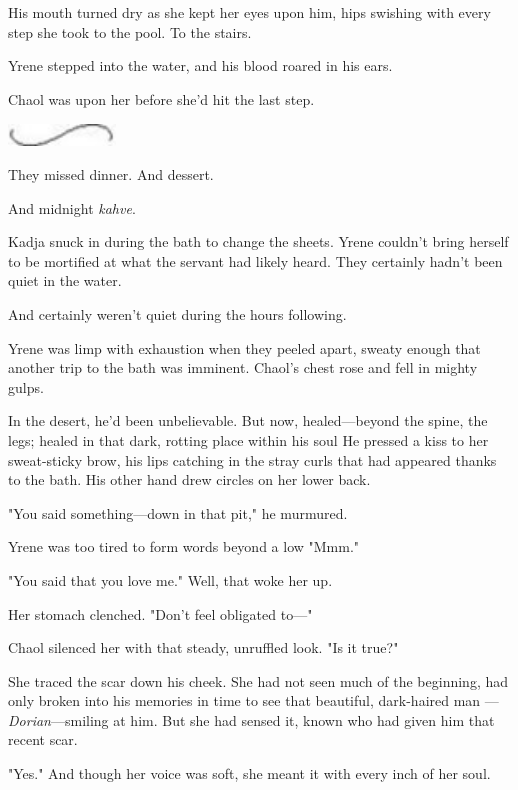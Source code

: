 His mouth turned dry as she kept her eyes upon him, hips swishing with every step she took to the pool.
To the stairs.

Yrene stepped into the water, and his blood roared in his ears.

Chaol was upon her before she'd hit the last step.

\begin{center}
	\includegraphics[width=1.12in,height=0.24in]{images/seperator}
\end{center}

They missed dinner.
And dessert.

And midnight \emph{kahve}.

Kadja snuck in during the bath to change the sheets.
Yrene couldn't bring herself to be mortified at what the servant had likely heard.
They certainly hadn't been quiet in the water.

And certainly weren't quiet during the hours following.

Yrene was limp with exhaustion when they peeled apart, sweaty enough that another trip to the bath was imminent.
Chaol's chest rose and fell in mighty gulps.

In the desert, he'd been unbelievable.
But now, healed---beyond the spine, the legs; healed in that dark, rotting place within his soul 
He pressed a kiss to her sweat-sticky brow, his lips catching in the stray curls that had appeared thanks to the bath.
His other hand drew circles on her lower back.

"You said something---down in that pit," he murmured.

Yrene was too tired to form words beyond a low "Mmm."

"You said that you love me."
Well, that woke her up.

Her stomach clenched.
"Don't feel obligated to---"

Chaol silenced her with that steady, unruffled look.
"Is it true?"

She traced the scar down his cheek.
She had not seen much of the beginning, had only broken into his memories in time to see that beautiful, dark-haired man ---\emph{Dorian}---smiling at him.
But she had sensed it, known who had given him that recent scar.

"Yes."
And though her voice was soft, she meant it with every inch of her soul.

